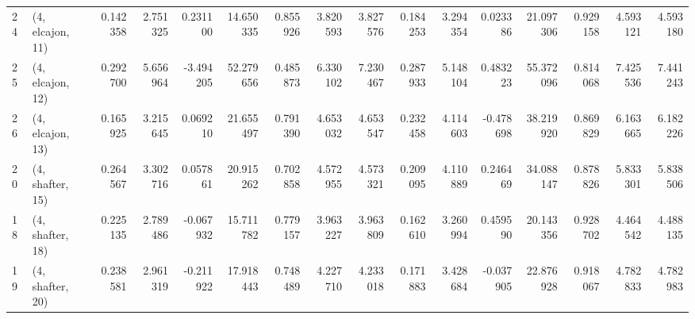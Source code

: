 \begin{tabular}{llrrrrrrrrrrrrrr}
24 &  (4, elcajon, 11) &   0.142358 &  2.751325 &  0.231100 &  14.650335 &  0.855926 &   3.820593 &  3.827576 &  0.184253 &  3.294354 &  0.023386 &   21.097306 &  0.929158 &   4.593121 &   4.593180 \\
25 &  (4, elcajon, 12) &   0.292700 &  5.656964 & -3.494205 &  52.279656 &  0.485873 &   6.330102 &  7.230467 &  0.287933 &  5.148104 &  0.483223 &   55.372096 &  0.814068 &   7.425536 &   7.441243 \\
26 &  (4, elcajon, 13) &   0.165925 &  3.215645 &  0.069210 &  21.655497 &  0.791390 &   4.653032 &  4.653547 &  0.232458 &  4.114603 & -0.478698 &   38.219920 &  0.869829 &   6.163665 &   6.182226 \\
20 &  (4, shafter, 15) &   0.264567 &  3.302716 &  0.057861 &  20.915262 &  0.702858 &   4.572955 &  4.573321 &  0.209095 &  4.110889 &  0.246469 &   34.088147 &  0.878826 &   5.833301 &   5.838506 \\
18 &  (4, shafter, 18) &   0.225135 &  2.789486 & -0.067932 &  15.711782 &  0.779157 &   3.963227 &  3.963809 &  0.162610 &  3.260994 &  0.459590 &   20.143356 &  0.928702 &   4.464542 &   4.488135 \\
19 &  (4, shafter, 20) &   0.238581 &  2.961319 & -0.211922 &  17.918443 &  0.748489 &   4.227710 &  4.233018 &  0.171883 &  3.428684 & -0.037905 &   22.876928 &  0.918067 &   4.782833 &   4.782983 \\
\bottomrule
\end{tabular}
